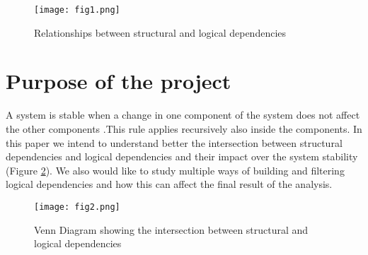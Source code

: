 \begin{figure}[h]
\centering
\texttt{[image: fig1.png]}
\caption{Relationships between structural and logical dependencies }
\label{fig:fig1}
\centering
\end{figure}




\section{Purpose of the project}
\tab A system is stable when a change in one component of the system does not aﬀect the other components .This rule applies recursively also inside the components.
In this paper we intend to understand better the intersection between structural dependencies and logical dependencies and their impact over the system stability (Figure \ref{fig:fig2}). We also would like to study multiple ways of building and filtering logical dependencies and how this can affect the final result of the analysis.


\begin{figure}[h]
\centering
\texttt{[image: fig2.png]}
\caption{Venn Diagram showing the intersection between structural and logical dependencies }
\label{fig:fig2}
\end{figure}